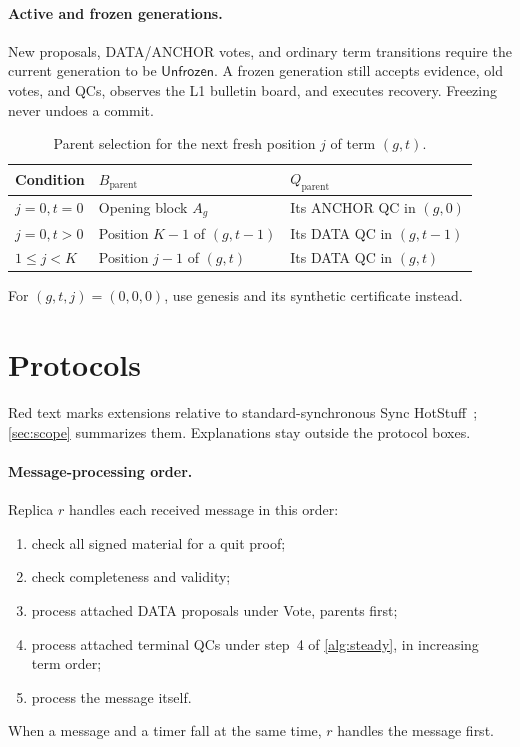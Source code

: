 \documentclass[11pt,a4paper]{article}
\newcommand{\RR}[1]{{\color{rrRed}#1}}
\newcommand{\tagg}[1]{\ensuremath{\mathsf{#1}}}
\newcounter{protocol}
\begin{document}
\paragraph{Active and frozen generations.}
New proposals, DATA/ANCHOR votes, and ordinary term transitions require
the current generation to be \tagg{Unfrozen}. A frozen generation still
accepts evidence, old votes, and QCs, observes the L1 bulletin board, and
executes recovery. Freezing never undoes a commit.

\begin{table}[htbp]\centering\small
\caption{Parent selection for the next fresh position $j$ of term $(g,t)$.}
\label{tab:parent}
\begin{tabularx}{\linewidth}{@{}l Y Y@{}}
\toprule
Condition & $B_{\mathrm{parent}}$ & $Q_{\mathrm{parent}}$\\
\midrule
$j=0,t=0$ & Opening block $A_g$ & Its ANCHOR QC in $(g,0)$\\
$j=0,t>0$ & Position $K-1$ of $(g,t-1)$ & Its DATA QC in $(g,t-1)$\\
$1\le j<K$ & Position $j-1$ of $(g,t)$ & Its DATA QC in $(g,t)$\\
\bottomrule
\end{tabularx}
\smallskip
For $(g,t,j)=(0,0,0)$, use genesis and its synthetic certificate instead.
\end{table}

\section{Protocols}
\label{sec:protocols}
\RR{Red text} marks extensions relative to standard-synchronous
Sync HotStuff~\cite{sync}; \cref{sec:scope} summarizes them. Explanations
stay outside the protocol boxes.

\paragraph{Message-processing order.}
Replica $r$ handles each received message in this order:
\begin{enumerate}[label=(\arabic*)]
\item check all signed material for a quit proof;
\item check completeness and validity;
\item \RR{process attached DATA proposals under Vote, parents first;}
\item \RR{process attached terminal QCs under step~4 of \cref{alg:steady}, in
increasing term order;}
\item process the message itself.
\end{enumerate}
When a message and a timer fall at the same time, $r$ handles the message
first.
\end{document}
